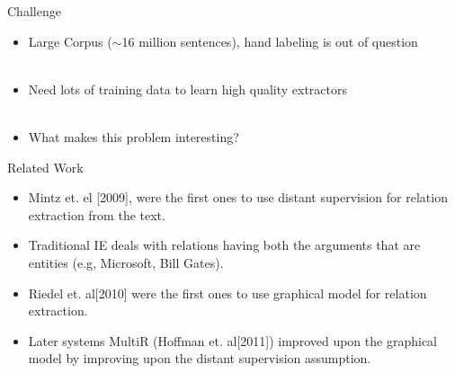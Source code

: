 \documentclass{beamer}
\begin{document}
\begin{frame}{Challenge}
 \begin{itemize}
  \item Large Corpus ($\sim$16 million sentences), hand labeling is out of question \pause \\~\\
  \item Need lots of training data to learn high quality extractors \pause \\~\\
  \item What makes this problem interesting?
 \end{itemize}
\end{frame}

\begin{frame}{Related Work}
 \begin{itemize}
 \setlength \itemsep{2em}
  \item Mintz et. el [2009], were the first ones to use distant supervision for relation extraction from the text.
  \item Traditional IE deals with relations having both the arguments that are entities (e.g, Microsoft, Bill Gates).
  \item Riedel et. al[2010] were the first ones to use graphical model for relation extraction.
  \item Later systems MultiR (Hoffman et. al[2011]) improved upon the graphical model by improving upon the distant supervision assumption.
  
 \end{itemize}
\end{frame}



\end{document}
